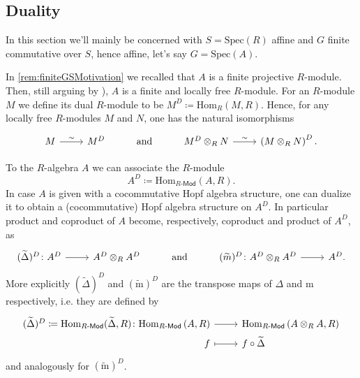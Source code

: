 \documentclass[../Main]{subfiles}
\begin{document}
\subsection{Duality}
In this section we'll mainly be concerned with $S = \mathrm{Spec}(R)$ affine
and $G$ finite commutative over $S$, hence affine, let's say $G = \mathrm{Spec}(A)$.

\begin{rem}[]
	In \cref{rem:finiteGSMotivation} we recalled that $A$ is a finite projective $R$-module.
	Then, still arguing by
	\cite[\href{https://stacks.math.columbia.edu/tag/00NX}{Lemma 00NX}]{SP}),
	$A$ is a finite and locally free $R$-module.
	For an $R$-module $M$ we define its dual $R$-module to be
	$M^D \coloneqq \mathrm{Hom}_{R} \left( M, R \right)$.
	Hence, for any locally free $R$-modules $M$ and $N$,
	one has the natural isomorphisms
	\begin{equation*}
	\begin{tikzcd}
		M \arrow[r, "\sim", rightarrow] &
		M^D &
		\text{and} &
		M^D \otimes_R N \arrow[r, "\sim", rightarrow] &
		\left( M \otimes_R N \right)^D
	.\end{tikzcd}
	\end{equation*}
\end{rem}


\begin{rem}
	To the $R$-algebra $A$ we can associate the $R$-module 
	\begin{equation*}
	A^D \coloneqq \mathrm{Hom}_{ R\text{-}\mathsf{Mod} } \left( A, R \right)
	.\end{equation*} 
	In case $A$ is given with a cocommutative Hopf algebra structure, one
	can dualize it to obtain a (cocommutative) Hopf algebra structure on $A^D$.
	In particular product and coproduct of $A$ become, respectively,
	coproduct and product of $A^D$, as
	\begin{equation*}
	\begin{tikzcd}
		(\widetilde{\Delta})^D\colon
		A^D \arrow[r, "", rightarrow] &
		A^D \otimes_R A^D &
		\text{\text{and}} &
		(\widetilde{m})^D\colon
		A^D \otimes_R A^D \arrow[r, "", rightarrow] &
		A^D 
	.\end{tikzcd}
	\end{equation*}
	More explicitly $(\widetilde{\Delta})^D$ and $(\widetilde{\mathrm{m}})^D$ are
	the transpose maps of $\Delta$ and $\mathrm{m}$ respectively,
	i.e. they are defined by
	\begin{equation*}
	\begin{tikzcd}[row sep = 0ex
		,/tikz/column 1/.append style={anchor=base east}
		,/tikz/column 2/.append style={anchor=base west}]
		(\widetilde{\Delta})^D \coloneqq \mathrm{Hom}_{ R\text{-}\mathsf{Mod} }
		( \widetilde{\Delta}, R )
		\colon \mathrm{Hom}_{ R\text{-}\mathsf{Mod} } \left( A, R \right)\arrow[r, "", rightarrow] &
		\mathrm{Hom}_{ R\text{-}\mathsf{Mod} } \left( A \otimes_R A, R \right)\\
		f \arrow[r, "", mapsto] & f \circ \widetilde{\Delta}
	\end{tikzcd}
	\end{equation*} 
	and analogously for $(\widetilde{\mathrm{m}})^D$.
\end{rem}
\end{document}
